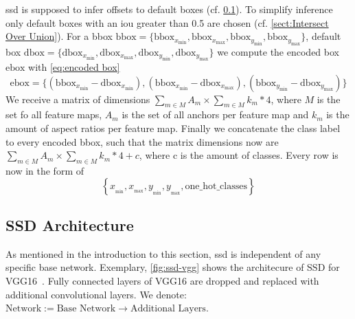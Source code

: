 \gls{ssd} is supposed to infer offsets to default
boxes (cf. \cref{subsect:SSD Architecture}). To simplify inference only default
boxes with an \gls{iou} greater than 0.5 are chosen (cf. \cref{sect:Intersect Over Union}). For a \gls{bbox}
\(\text{bbox}=\{\text{bbox}_{x_\text{min}}, \text{bbox}_{x_\text{max}}, \text{bbox}_{y_\text{min}}, \text{bbox}_{y_\text{max}}\}\), default box
\(\text{dbox}=\{\text{dbox}_{x_\text{min}}, \text{dbox}_{x_\text{max}}, \text{dbox}_{y_\text{min}}, \text{dbox}_{y_\text{max}}\}\) we compute the
encoded box \(\text{ebox}\) with \cref{eq:encoded box}
\begin{equation}
    \text{ebox}=\{(\text{bbox}_{x_\text{min}}-\text{dbox}_{x_\text{min}}), (\text{bbox}_{x_\text{min}}-\text{dbox}_{x_\text{max}}), (\text{bbox}_{y_\text{min}}-\text{dbox}_{y_\text{max}})\}\label{eq:encoded box}
\end{equation}
We receive a matrix of dimensions \(\sum_{m\in M}{A_m}\times \sum_{m\in M}{k_m*4}\),
where \(M\) is the set fo all \glspl{feature map}, \(A_m\) is the set of all anchors per
\gls{feature map} and \(k_m\) is the amount of aspect ratios per \gls{feature map}. Finally
we concatenate the class label to every encoded \gls{bbox}, such that the matrix
dimensions now are \(\sum_{m\in M}{A_m}\times \sum_{m\in M}{k_m*4+c}\), where c
is the amount of classes. Every row is now in the form of
\begin{equation}
    \left\{x_{_\text{min}}, x_{_\text{max}}, y_{_\text{min}}, y_{_\text{max}}, \text{one\_hot\_classes} \right\}
\end{equation}


\subsection{SSD Architecture}\label{subsect:SSD Architecture}
As mentioned in the introduction to this section, \gls{ssd} is independent of any
specific base network. Exemplary, \cref{fig:ssd-vgg} shows the architecure of
SSD for VGG16~\cite{Simonyan.2015}. Fully connected \glspl{layer} of VGG16 are
dropped and replaced with additional \glspl{convolutional layer}. We denote: 
\(\text{Network}:=\text{Base Network}\rightarrow \text{Additional Layers}\).

